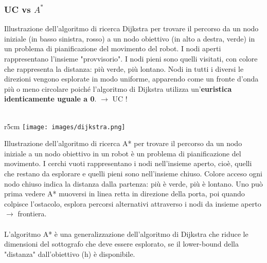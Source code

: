 \subsubsection{UC vs $A^*$}
Illustrazione dell'algoritmo di ricerca Dijkstra per trovare il percorso da un nodo iniziale (in basso
sinistra, rosso) a un nodo obiettivo (in alto a destra, verde) in un problema di pianificazione del movimento del robot.
I nodi aperti rappresentano l'insieme "provvisorio". I nodi pieni sono quelli visitati, con colore
che rappresenta la distanza: più verde, più lontano. Nodi in tutti i diversi
le direzioni vengono esplorate in modo uniforme, apparendo come un fronte d'onda più o meno circolare
poiché l'algoritmo di Dijkstra utilizza un'\textbf{euristica identicamente uguale a 0}. $\to$ UC !\\\\
\begin{wrapfigure}[6]{r}{5cm}
    \vspace{-35pt}
    \centering
    \texttt{[image: images/dijkstra.png]}
\end{wrapfigure}
Illustrazione dell'algoritmo di ricerca A* per trovare il percorso da un nodo iniziale a un nodo obiettivo in un robot è un
problema di pianificazione del movimento. I cerchi vuoti rappresentano i nodi nell'insieme aperto, cioè,
quelli che restano da esplorare e quelli pieni sono nell'insieme chiuso. Colore acceso
ogni nodo chiuso indica la distanza dalla partenza: più è verde, più è lontano. Uno
può prima vedere A* muoversi in linea retta in direzione della porta, poi quando colpisce l'ostacolo, esplora percorsi alternativi attraverso i nodi da insieme aperto $\to$ frontiera.\\\\
L'algoritmo A* è una generalizzazione dell'algoritmo di Dijkstra che riduce le dimensioni del sottografo che deve essere esplorato, se il lower-bound
della "distanza" dall'obiettivo (h) è disponibile.


